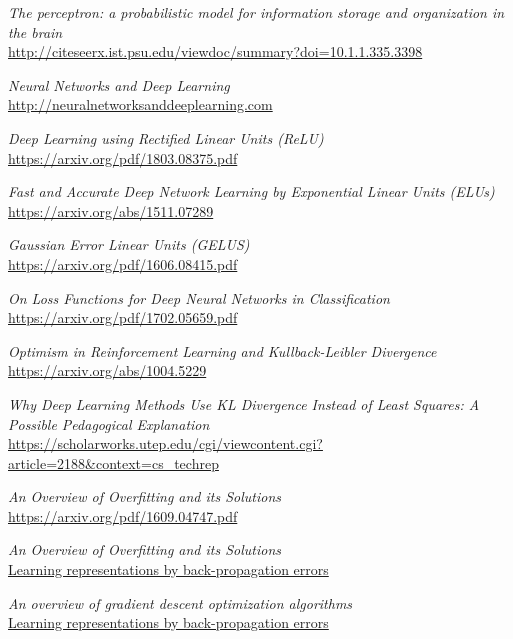 \begin{thebibliography}{99}

\renewcommand{\baselinestretch}{1} 


\textit{The perceptron: a probabilistic model for information storage and organization in the brain}
\\\url{http://citeseerx.ist.psu.edu/viewdoc/summary?doi=10.1.1.335.3398}

\textit{Neural Networks and Deep Learning}
\\\url{http://neuralnetworksanddeeplearning.com}

\textit{Deep Learning using Rectified Linear Units (ReLU)}
\\\url{https://arxiv.org/pdf/1803.08375.pdf}

\textit{Fast and Accurate Deep Network Learning by Exponential Linear Units (ELUs)}
\\\url{https://arxiv.org/abs/1511.07289}

\textit{Gaussian Error Linear Units (GELUS)}
\\\url{https://arxiv.org/pdf/1606.08415.pdf}

\textit{On Loss Functions for Deep Neural Networks
in Classification}
\\\url{https://arxiv.org/pdf/1702.05659.pdf}

\textit{Optimism in Reinforcement Learning and Kullback-Leibler Divergence
}
\\\url{https://arxiv.org/abs/1004.5229}

\textit{Why Deep Learning Methods Use KL Divergence
Instead of Least Squares: A Possible Pedagogical
Explanation}
\\\url{https://scholarworks.utep.edu/cgi/viewcontent.cgi?article=2188&context=cs_techrep}



\textit{An Overview of Overfitting and its Solutions}
\\\url{https://arxiv.org/pdf/1609.04747.pdf}


\textit{An Overview of Overfitting and its Solutions}
\\\url{Learning representations by back-propagation errors}

\textit{An overview of gradient descent optimization
algorithms}
\\\url{Learning representations by back-propagation errors}


\end{thebibliography}
